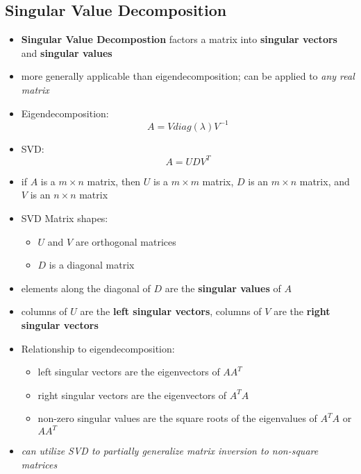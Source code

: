 \subsection{Singular Value Decomposition}
\begin{itemize}
    \item \textbf{Singular Value Decompostion} factors a matrix into \textbf{singular vectors} and \textbf{singular values}
    \item more generally applicable than eigendecomposition; can be applied to \textit{any real matrix}
    \item Eigendecomposition:
    $$ A = V diag(\lambda)V^{-1}$$
    \item SVD:
    $$ A = UDV^T$$
    \item if $A$ is a $m \times n$ matrix, then $U$ is a $m \times m$ matrix, $D$ is an $m \times n$ matrix, and $V$ is an $n \times n$ matrix
    \item SVD Matrix shapes:
    \begin{itemize}
        \item $U$ and $V$ are orthogonal matrices
        \item $D$ is a diagonal matrix
    \end{itemize}
    \item elements along the diagonal of $D$ are the \textbf{singular values} of $A$
    \item columns of $U$ are the \textbf{left singular vectors}, columns of $V$ are the \textbf{right singular vectors}
    \item Relationship to eigendecomposition:
    \begin{itemize}
        \item left singular vectors are the eigenvectors of $AA^T$
        \item right singular vectors are the eigenvectors of $A^TA$
        \item non-zero singular values are the square roots of the eigenvalues of $A^TA$ or $AA^T$
    \end{itemize}
    \item \textit{can utilize SVD to partially generalize matrix inversion to non-square matrices}
\end{itemize}

